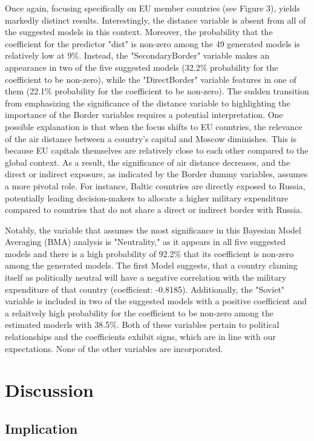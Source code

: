 \documentclass[12pt,a4paper]{article}
\begin{document}
Once again, focusing specifically on EU member countries (see Figure 3), yields markedly distinct results. Interestingly, the distance variable is absent from all of the suggested models in this context. Moreover, the probability that the coefficient for the predictor "dist" is non-zero among the 49 generated models is relatively low at 9\%. Instead, the "SecondaryBorder" variable makes an appearance in two of the five suggested models (32.2\% probability for the coefficient to be non-zero), while the "DirectBorder" variable features in one of them (22.1\% probability for the coefficient to be non-zero). The sudden transition from emphasizing the significance of the distance variable to highlighting the importance of the Border variables requires a potential interpretation. One possible explanation is that when the focus shifts to EU countries, the relevance of the air distance between a country's capital and Moscow diminishes. This is because EU capitals themselves are relatively close to each other compared to the global context. As a result, the significance of air distance decreases, and the direct or indirect exposure, as indicated by the Border dummy variables, assumes a more pivotal role. For instance, Baltic countries are directly exposed to Russia, potentially leading decision-makers to allocate a higher military expenditure compared to countries that do not share a direct or indirect border with Russia.

Notably, the variable that assumes the most significance in this Bayesian Model Averaging (BMA) analysis is "Neutrality," as it appears in all five suggested models and there is a high probability of 92.2\% that its coefficient is non-zero among the generated models. The first Model suggests, that a country claming itself as politically neutral will have a negative correlation with the military expenditure of that country (coefficient: -0.8185). Additionally, the "Soviet" variable is included in two of the suggested models with a positive coefficient and a relaitvely high probability for the coefficient to be non-zero among the estimated moderls with 38.5\%.  Both of these variables pertain to political relationships and the coefficients exhibit signs, which are in line with our expectations. None of the other variables are incorporated.


\section{Discussion}
\subsection{Implication}
\end{document}
